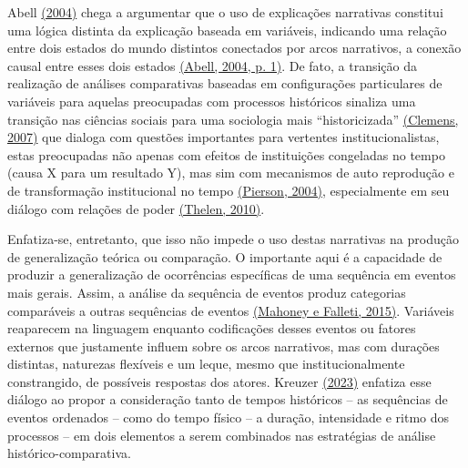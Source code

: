 Abell \href{https://www.zotero.org/google-docs/?wYswjO}{(2004)} chega a
argumentar que o uso de explicações narrativas constitui uma lógica
distinta da explicação baseada em variáveis, indicando uma relação entre
dois estados do mundo distintos conectados por arcos narrativos, a
conexão causal entre esses dois estados
\href{https://www.zotero.org/google-docs/?woV5NZ}{(Abell, 2004, p. 1)}.
De fato, a transição da realização de análises comparativas baseadas em
configurações particulares de variáveis para aquelas preocupadas com
processos históricos sinaliza uma transição nas ciências sociais para
uma sociologia mais ``historicizada''
\href{https://www.zotero.org/google-docs/?sCHMir}{(Clemens, 2007)} que
dialoga com questões importantes para vertentes institucionalistas,
estas preocupadas não apenas com efeitos de instituições congeladas no
tempo (causa X para um resultado Y), mas sim com mecanismos de auto
reprodução e de transformação institucional no tempo
\href{https://www.zotero.org/google-docs/?NlMC2Q}{(Pierson, 2004)},
especialmente em seu diálogo com relações de poder
\href{https://www.zotero.org/google-docs/?aKl70V}{(Thelen, 2010)}.

Enfatiza-se, entretanto, que isso não impede o uso destas narrativas na
produção de generalização teórica ou comparação. O importante aqui é a
capacidade de produzir a generalização de ocorrências específicas de uma
sequência em eventos mais gerais. Assim, a análise da sequência de
eventos produz categorias comparáveis a outras sequências de eventos
\href{https://www.zotero.org/google-docs/?VZoDIr}{(Mahoney e Falleti,
2015)}. Variáveis reaparecem na linguagem enquanto codificações desses
eventos ou fatores externos que justamente influem sobre os arcos
narrativos, mas com durações distintas, naturezas flexíveis e um leque,
mesmo que institucionalmente constrangido, de possíveis respostas dos
atores. Kreuzer
\href{https://www.zotero.org/google-docs/?BZJpwu}{(2023)} enfatiza esse
diálogo ao propor a consideração tanto de tempos históricos -- as
sequências de eventos ordenados -- como do tempo físico -- a duração,
intensidade e ritmo dos processos -- em dois elementos a serem
combinados nas estratégias de análise histórico-comparativa.

